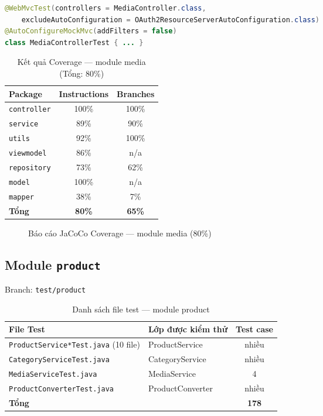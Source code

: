 \begin{lstlisting}[language=Java, caption={Cấu hình @WebMvcTest cho MediaController}]
@WebMvcTest(controllers = MediaController.class,
    excludeAutoConfiguration = OAuth2ResourceServerAutoConfiguration.class)
@AutoConfigureMockMvc(addFilters = false)
class MediaControllerTest { ... }
\end{lstlisting}

\begin{table}[H]
\centering
\caption{Kết quả Coverage --- module media (Tổng: 80\%)}
\begin{tabular}{|l|c|c|}
\hline
\textbf{Package} & \textbf{Instructions} & \textbf{Branches} \\
\hline
\texttt{controller} & 100\% & 100\% \\
\hline
\texttt{service} & 89\% & 90\% \\
\hline
\texttt{utils} & 92\% & 100\% \\
\hline
\texttt{viewmodel} & 86\% & n/a \\
\hline
\texttt{repository} & 73\% & 62\% \\
\hline
\texttt{model} & 100\% & n/a \\
\hline
\texttt{mapper} & 38\% & 7\% \\
\hline
\textbf{Tổng} & \textbf{80\%} & \textbf{65\%} \\
\hline
\end{tabular}
\end{table}

\begin{figure}[H]
\centering
{}
\caption{Báo cáo JaCoCo Coverage --- module media (80\%)}
\end{figure}

\subsection{Module \texttt{product}}

Branch: \texttt{test/product}

\begin{table}[H]
\centering
\caption{Danh sách file test --- module product}
\begin{tabular}{|l|l|c|}
\hline
\textbf{File Test} & \textbf{Lớp được kiểm thử} & \textbf{Test case} \\
\hline
\texttt{ProductService*Test.java} (10 file) & ProductService & nhiều \\
\hline
\texttt{CategoryServiceTest.java} & CategoryService & nhiều \\
\hline
\texttt{MediaServiceTest.java} & MediaService & 4 \\
\hline
\texttt{ProductConverterTest.java} & ProductConverter & nhiều \\
\hline
\textbf{Tổng} & & \textbf{178} \\
\hline
\end{tabular}
\end{table}

